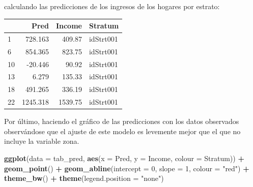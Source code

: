 \documentclass[
  12pt,
]{book}
\newenvironment{Shaded}{\begin{snugshade}}{\end{snugshade}}
\newcommand{\AttributeTok}[1]{\textcolor[rgb]{0.13,0.29,0.53}{#1}}
\newcommand{\DataTypeTok}[1]{\textcolor[rgb]{0.13,0.29,0.53}{#1}}
\newcommand{\DecValTok}[1]{\textcolor[rgb]{0.00,0.00,0.81}{#1}}
\newcommand{\FunctionTok}[1]{\textcolor[rgb]{0.13,0.29,0.53}{\textbf{#1}}}
\newcommand{\NormalTok}[1]{#1}
\newcommand{\OtherTok}[1]{\textcolor[rgb]{0.56,0.35,0.01}{#1}}
\newcommand{\SpecialCharTok}[1]{\textcolor[rgb]{0.81,0.36,0.00}{\textbf{#1}}}
\newcommand{\StringTok}[1]{\textcolor[rgb]{0.31,0.60,0.02}{#1}}
\begin{document}
calculando las predicciones de los ingresos de los hogares por estrato:

\begin{Shaded}
\end{Shaded}

\begin{tabular}{l|r|r|l}
\hline
  & Pred & Income & Stratum\\
\hline
1 & 728.163 & 409.87 & idStrt001\\
\hline
6 & 854.365 & 823.75 & idStrt001\\
\hline
10 & -20.446 & 90.92 & idStrt001\\
\hline
13 & 6.279 & 135.33 & idStrt001\\
\hline
18 & 491.265 & 336.19 & idStrt001\\
\hline
22 & 1245.318 & 1539.75 & idStrt001\\
\hline
\end{tabular}

Por último, haciendo el gráfico de las predicciones con los datos observados observándose que el ajuste de este modelo es levemente mejor que el que no incluye la variable zona.

\begin{Shaded}
\begin{Highlighting}[]
\FunctionTok{ggplot}\NormalTok{(}\AttributeTok{data =}\NormalTok{ tab\_pred, }\FunctionTok{aes}\NormalTok{(}\AttributeTok{x =}\NormalTok{ Pred, }\AttributeTok{y =}\NormalTok{ Income, }\AttributeTok{colour =}\NormalTok{ Stratum)) }\SpecialCharTok{+} 
  \FunctionTok{geom\_point}\NormalTok{() }\SpecialCharTok{+} \FunctionTok{geom\_abline}\NormalTok{(}\AttributeTok{intercept =} \DecValTok{0}\NormalTok{, }\AttributeTok{slope =} \DecValTok{1}\NormalTok{, }\AttributeTok{colour =} \StringTok{"red"}\NormalTok{) }\SpecialCharTok{+}
  \FunctionTok{theme\_bw}\NormalTok{() }\SpecialCharTok{+} \FunctionTok{theme}\NormalTok{(}\AttributeTok{legend.position =} \StringTok{"none"}\NormalTok{) }
\end{Highlighting}
\end{Shaded}
\end{document}
